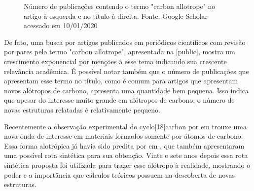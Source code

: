 	\begin{figure}[!h]
		\centering
		\caption{Número de publicações contendo o termo "carbon allotrope" no artigo à esquerda e no título à direita. Fonte: Google Scholar acessado em 10/01/2020}
		\label{public}
	\end{figure}
	
	De fato, uma busca por artigos publicados em periódicos científicos com revisão por pares pelo termo "carbon allotrope", apresentada na \autoref{public}, mostra um crescimento exponencial por menções à esse tema indicando sua crescente relevância acadêmica. É possível notar também que o número de publicações que apresentam esse termo no título, como é comum para artigos que apresentam novos alótropos de carbono, apresenta uma quantidade bem pequena. Isso indica que apesar do interesse muito grande em alótropos de carbono, o número de novas estruturas relatadas é relativamente pequeno. 
	
	Recentemente a observação experimental do cyclo[18]carbon por \citeauthor{kaiser2019sp} em \citeyear{kaiser2019sp} trouxe uma nova onda de interesse em materiais formados somente por átomos de carbono. Essa forma alotrópica já havia sido predita por \citeauthor{diederich1992synthetic} em \citeyear{diederich1992synthetic}, que também apresentaram uma possível rota sintética para sua obtenção. Vinte e sete anos depois essa rota sintética proposta foi utilizada para trazer esse alótropo à realidade, mostrando o poder e a importância que cálculos teóricos possuem na descoberta de novas estruturas. 
	
